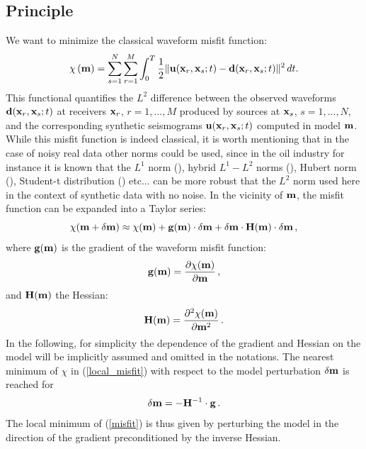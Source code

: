 \subsection{Principle}

We want to minimize the classical waveform misfit function:
\begin{equation}
\chi \left( \mathbf{m} \right) = \sum_{s=1}^N\sum_{r=1}^M \int_0^T \frac{1}{2} \|\mathbf{u}(\mathbf{x}_r, \mathbf{x}_s; t) - \mathbf{d}(\mathbf{x}_r, \mathbf{x}_s; t)\| ^{2} \, dt .
\label{misfit}
\end{equation}
This functional quantifies the $L^2$ difference between the observed waveforms $\mathbf{d}(\mathbf{x}_r, \mathbf{x}_s; t)$ at receivers $\mathbf{x}_r$, $r = 1, ..., M$
produced by sources at $\mathbf{x}_s$, $s=1,...,N$, and the corresponding synthetic seismograms $\mathbf{u}(\mathbf{x}_r, \mathbf{x}_s; t)$ computed in model $\mathbf{m}$.
While this misfit function is indeed classical, it is worth mentioning that in the case of noisy real data other norms could be used,
since in the oil industry for instance it is known that the $L^1$ norm
(\cite{CrPiNoMcTa90,Brossier_2010_WDR}), hybrid $L^1-L^2$ norms (\cite{Bube_1997_HL1}), Hubert norm (\cite{Ha_2009_WIU}),
Student-t distribution (\cite{ArVaHe11,Jeong_2015}) etc... can be more robust that the $L^2$ norm used here in the context of synthetic data with no noise.
In the vicinity of $\mathbf{m}$, the misfit function can be expanded into a Taylor series:
\begin{equation}
\chi(\mathbf{m}+ \delta\mathbf{m}) \approx \chi(\mathbf{m})+\mathbf{g}(\mathbf{m})\cdot\delta\mathbf{m}
+\delta\mathbf{m}\cdot\mathbf{H}(\mathbf{m})\cdot\delta\mathbf{m} \, ,
\label{local_misfit}
\end{equation}
where $\mathbf{g}(\mathbf{m})$ is the gradient of the waveform misfit function:
\begin{equation}
\mathbf{g}(\mathbf{m}) = \frac{\partial\chi(\mathbf{m})}{\partial\mathbf{m}} \, ,
\end{equation}
and $\mathbf{H}(\mathbf{m})$ the Hessian:
\begin{equation}
\mathbf{H}(\mathbf{m}) = \frac{\partial^2\chi(\mathbf{m})}{\partial\mathbf{m}^2} \, .
\end{equation}
In the following, for simplicity the dependence of the gradient and Hessian on the model will be implicitly assumed and omitted in the notations.
The nearest minimum of $\chi$ in (\ref{local_misfit}) with respect to the model perturbation $\delta \mathbf{m}$ is reached for
\begin{equation}
\delta \mathbf{m} = -\mathbf{H}^{-1} \cdot \mathbf{g} \, .
\label{Newton}
\end{equation}
The local minimum of (\ref{misfit}) is thus given by perturbing the model in the direction of the gradient preconditioned
by the inverse Hessian.

